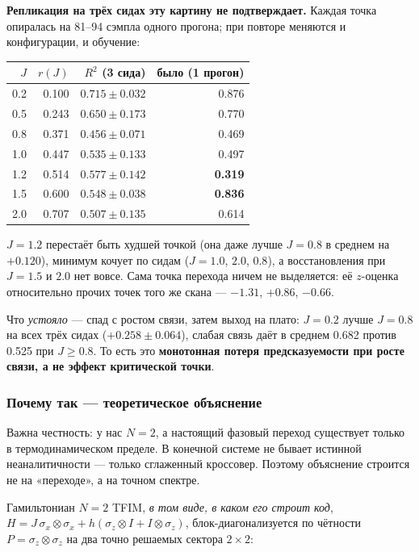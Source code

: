 \documentclass[12pt,a4paper]{article}
\begin{document}
\textbf{Репликация на трёх сидах эту картину не подтверждает.} Каждая точка
опиралась на 81–94 сэмпла одного прогона; при повторе меняются и конфигурации,
и обучение:

\begin{center}\small
\begin{tabular}{@{}rrrr@{}}
\toprule
$J$ & $r(J)$ & $R^2$ (3 сида) & было (1 прогон) \\
\midrule
0.2 & 0.100 & $0.715 \pm 0.032$ & 0.876 \\
0.5 & 0.243 & $0.650 \pm 0.173$ & 0.770 \\
0.8 & 0.371 & $0.456 \pm 0.071$ & 0.469 \\
1.0 & 0.447 & $0.535 \pm 0.133$ & 0.497 \\
1.2 & 0.514 & $0.577 \pm 0.142$ & \textbf{0.319} \\
1.5 & 0.600 & $0.548 \pm 0.038$ & \textbf{0.836} \\
2.0 & 0.707 & $0.507 \pm 0.135$ & 0.614 \\
\bottomrule
\end{tabular}
\end{center}

$J=1.2$ перестаёт быть худшей точкой (она даже лучше $J=0.8$ в среднем на
$+0.120$), минимум кочует по сидам ($J=1.0$, $2.0$, $0.8$), а восстановления
при $J=1.5$ и $2.0$ нет вовсе. Сама точка перехода ничем не выделяется:
её $z$-оценка относительно прочих точек того же скана — $-1.31$, $+0.86$,
$-0.66$.

Что \emph{устояло} — спад с ростом связи, затем выход на плато: $J=0.2$ лучше
$J=0.8$ на всех трёх сидах ($+0.258 \pm 0.064$), слабая связь даёт в среднем
0.682 против 0.525 при $J\geq0.8$. То есть это \textbf{монотонная потеря
предсказуемости при росте связи, а не эффект критической точки}.

\subsubsection*{Почему так — теоретическое объяснение}

Важна честность: у нас $N=2$, а настоящий фазовый переход существует только в
термодинамическом пределе. В конечной системе не бывает истинной
неаналитичности — только сглаженный кроссовер. Поэтому объяснение строится не на
«переходе», а на точном спектре.

Гамильтониан $N=2$ TFIM, \emph{в том виде, в каком его строит код},
$H = J\,\sigma_x\!\otimes\!\sigma_x + h(\sigma_z\otimes I + I\otimes\sigma_z)$,
блок-диагонализуется по чётности $P=\sigma_z\otimes\sigma_z$ на два точно
решаемых сектора $2\times 2$:
\end{document}
